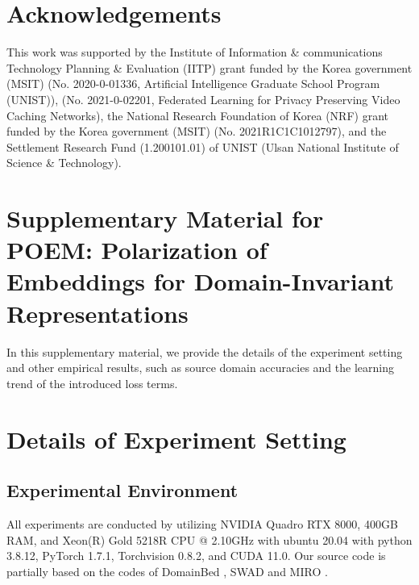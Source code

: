 \documentclass[letterpaper]{article} \usepackage{aaai23}  \usepackage{times}  \usepackage{helvet}  \usepackage{courier}  \usepackage[hyphens]{url}  \usepackage{graphicx} \urlstyle{rm} \def\UrlFont{\rm}  \usepackage{natbib}  \usepackage{caption} \frenchspacing  \setlength{\pdfpagewidth}{8.5in}  \setlength{\pdfpageheight}{11in}  \usepackage[labelsep=period]{caption}
\begin{document}
\section{Acknowledgements}
This work was supported by the Institute of Information \& communications Technology Planning \& Evaluation (IITP) grant funded by the Korea government (MSIT) (No. 2020-0-01336, Artificial Intelligence Graduate School Program (UNIST)), (No. 2021-0-02201, Federated Learning for Privacy Preserving Video Caching Networks), the National Research Foundation of Korea (NRF) grant funded by the Korea government (MSIT) (No. 2021R1C1C1012797), and the Settlement Research Fund (1.200101.01) of UNIST (Ulsan National Institute of Science \& Technology).



\vspace{.2em}



\onecolumn
\newpage
\appendix
\section{Supplementary Material for POEM: Polarization of Embeddings for Domain-Invariant Representations}

In this supplementary material, we provide the details of the experiment setting and other empirical results, such as source domain accuracies and the learning trend of the introduced loss terms.

\section{Details of Experiment Setting}

\subsection{Experimental Environment}
All experiments are conducted by utilizing NVIDIA Quadro RTX 8000,  400GB RAM, and Xeon(R) Gold 5218R CPU @ 2.10GHz with ubuntu 20.04 with python 3.8.12, PyTorch 1.7.1, Torchvision 0.8.2, and CUDA 11.0. Our source code is partially based on the codes of DomainBed \cite{Domainbed}, SWAD \cite{SWAD} and MIRO \cite{MIRO}.
\end{document}
